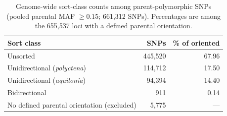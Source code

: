 \begin{table}[htbp]
\centering
\small
\caption{Genome-wide sort-class counts among parent-polymorphic SNPs (pooled parental MAF $\geq0.15$; 661,312 SNPs). Percentages are among the 655,537 loci with a defined parental orientation.}
\label{tab:sortclass}
\begin{tabular}{l r r}
\toprule
Sort class & SNPs & \% of oriented \\
\midrule
Unsorted & 445,520 & 67.96 \\
Unidirectional (\emph{polyctena}) & 114,712 & 17.50 \\
Unidirectional (\emph{aquilonia}) & 94,394 & 14.40 \\
Bidirectional & 911 & 0.14 \\
\midrule
No defined parental orientation (excluded) & 5,775 & --- \\
\bottomrule
\end{tabular}
\end{table}
